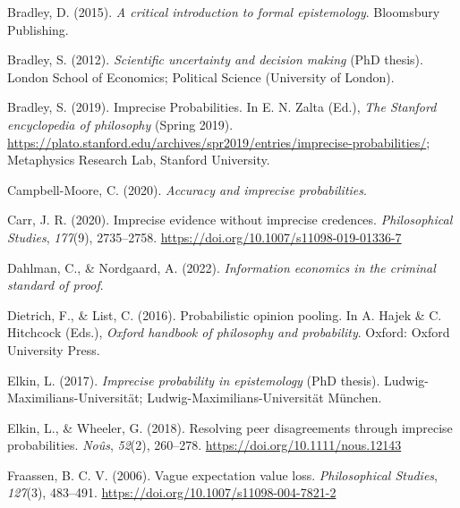 \documentclass[
  10pt,
  dvipsnames,enabledeprecatedfontcommands]{scrartcl}
\newlength{\cslhangindent}
\newlength{\cslentryspacingunit} %
\newenvironment{CSLReferences}[2] %
 {%
  \setlength{\parindent}{0pt}
  \ifodd #1
  \let\oldpar\par
  \def\par{\hangindent=\cslhangindent\oldpar}
  \fi
  \setlength{\parskip}{#2\cslentryspacingunit}
 }%
 {}
\begin{document}
\hypertarget{refs}{}
\begin{CSLReferences}{1}{0}
\leavevmode{}%
Bradley, D. (2015). \emph{A critical introduction to formal
epistemology}. Bloomsbury Publishing.

\leavevmode{}%
Bradley, S. (2012). \emph{Scientific uncertainty and decision making}
(PhD thesis). London School of Economics; Political Science (University
of London).

\leavevmode{}%
Bradley, S. (2019). {Imprecise Probabilities}. In E. N. Zalta (Ed.),
\emph{The {Stanford} encyclopedia of philosophy} ({S}pring 2019).
\url{https://plato.stanford.edu/archives/spr2019/entries/imprecise-probabilities/};
Metaphysics Research Lab, Stanford University.

\leavevmode{}%
Campbell-Moore, C. (2020). \emph{Accuracy and imprecise probabilities}.

\leavevmode{}%
Carr, J. R. (2020). Imprecise evidence without imprecise credences.
\emph{Philosophical Studies}, \emph{177}(9), 2735--2758.
\url{https://doi.org/10.1007/s11098-019-01336-7}

\leavevmode{}%
Dahlman, C., \& Nordgaard, A. (2022). \emph{Information economics in the
criminal standard of proof}.

\leavevmode{}%
Dietrich, F., \& List, C. (2016). Probabilistic opinion pooling. In A.
Hajek \& C. Hitchcock (Eds.), \emph{Oxford handbook of philosophy and
probability}. Oxford: Oxford University Press.

\leavevmode{}%
Elkin, L. (2017). \emph{Imprecise probability in epistemology} (PhD
thesis). Ludwig-Maximilians-Universit{ä}t;
Ludwig-Maximilians-Universität München.

\leavevmode{}%
Elkin, L., \& Wheeler, G. (2018). Resolving peer disagreements through
imprecise probabilities. \emph{Noûs}, \emph{52}(2), 260--278.
\url{https://doi.org/10.1111/nous.12143}

\leavevmode{}%
Fraassen, B. C. V. (2006). Vague expectation value loss.
\emph{Philosophical Studies}, \emph{127}(3), 483--491.
\url{https://doi.org/10.1007/s11098-004-7821-2}


\end{CSLReferences}
\end{document}
